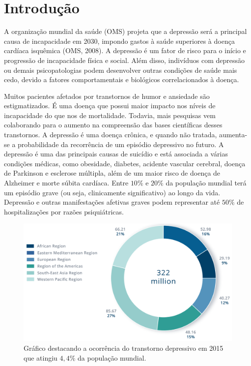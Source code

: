 \chapter{Introdução}

A organização mundial da saúde (OMS) projeta que a depressão será a principal causa de incapacidade em 2030, impondo gastos à saúde superiores à doença cardíaca isquêmica (OMS, 2008). A depressão é um fator de risco para o início e progressão de incapacidade física e social. Além disso, indivíduos com depressão ou demais psicopatologias podem desenvolver outras condições de saúde mais cedo, devido a fatores comportamentais e biológicos correlacionados à doença. \cite{Nestler2013}

Muitos pacientes afetados por transtornos de humor e ansiedade são estigmatizados. É uma doença que possui maior impacto nos níveis de incapacidade do que nos de mortalidade. Todavia, mais pesquisas vem colaborando para o aumento na compreensão das bases científicas desses transtornos. \cite{Kandel} A depressão é uma doença crônica, e quando não tratada, aumenta-se a probabilidade da recorrência de um episódio depressivo no futuro. A depressão é uma das principais causas de suicídio e está associada a várias condições médicas, como obesidade, diabetes, acidente vascular cerebral, doença de Parkinson e esclerose múltipla, além de um maior risco de doença de Alzheimer e morte súbita cardíaca. \cite{Nestler2006} Entre $10\%$ e $20\%$ da população mundial terá um episódio grave (ou seja, clinicamente significativo) ao longo da vida. Depressão e outras manifestações afetivas graves podem representar até $50\%$ de hospitalizações por razões psiquiátricas. \cite{Cooper2003}

\begin{figure}[H]
\centering
\includegraphics[scale=1]{Figuras/who2017.png}
\caption{Gráfico destacando a ocorrência do transtorno depressivo em 2015 que atingiu $4,4\%$ da população mundial.  \cite{WHO2017}}
\end{figure}

